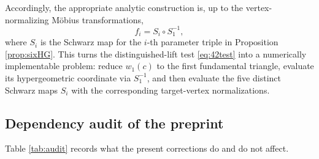 Accordingly, the appropriate analytic construction is, up to the vertex-normalizing Möbius transformations,
\begin{equation}\label{eq:correctschwarzcomposition}
 f_i=S_i\circ S_1^{-1},
\end{equation}
where $S_i$ is the Schwarz map for the $i$-th parameter triple in Proposition \ref{prop:sixHG}. This turns the distinguished-lift test \eqref{eq:42test} into a numerically implementable problem: reduce $w_1(c)$ to the first fundamental triangle, evaluate its hypergeometric coordinate via $S_1^{-1}$, and then evaluate the five distinct Schwarz maps $S_i$ with the corresponding target-vertex normalizations.


\subsection{Dependency audit of the preprint}
Table \ref{tab:audit} records what the present corrections do and do not affect.

